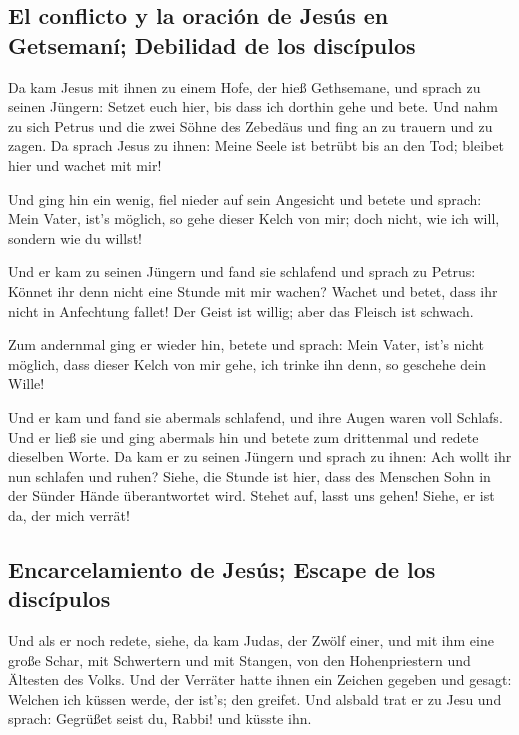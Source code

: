 \hypertarget{el-conflicto-y-la-oraciuxf3n-de-jesuxfas-en-getsemanuxed-debilidad-de-los-discuxedpulos}{%
\subsection{El conflicto y la oración de Jesús en Getsemaní; Debilidad
de los
discípulos}\label{el-conflicto-y-la-oraciuxf3n-de-jesuxfas-en-getsemanuxed-debilidad-de-los-discuxedpulos}}

 Da kam Jesus mit ihnen zu einem Hofe, der hieß
Gethsemane, und sprach zu seinen Jüngern: Setzet euch hier, bis dass ich
dorthin gehe und bete.  Und nahm zu sich Petrus und die
zwei Söhne des Zebedäus und fing an zu trauern und zu zagen.
 Da sprach Jesus zu ihnen: Meine Seele ist betrübt bis an
den Tod; bleibet hier und wachet mit mir!

 Und ging hin ein wenig, fiel nieder auf sein Angesicht
und betete und sprach: Mein Vater, ist's möglich, so gehe dieser Kelch
von mir; doch nicht, wie ich will, sondern wie du willst!

 Und er kam zu seinen Jüngern und fand sie schlafend und
sprach zu Petrus: Könnet ihr denn nicht eine Stunde mit mir wachen?
 Wachet und betet, dass ihr nicht in Anfechtung fallet!
Der Geist ist willig; aber das Fleisch ist schwach.

 Zum andernmal ging er wieder hin, betete und sprach:
Mein Vater, ist's nicht möglich, dass dieser Kelch von mir gehe, ich
trinke ihn denn, so geschehe dein Wille!

 Und er kam und fand sie abermals schlafend, und ihre
Augen waren voll Schlafs.  Und er ließ sie und ging
abermals hin und betete zum drittenmal und redete dieselben Worte.
 Da kam er zu seinen Jüngern und sprach zu ihnen: Ach
wollt ihr nun schlafen und ruhen? Siehe, die Stunde ist hier, dass des
Menschen Sohn in der Sünder Hände überantwortet wird. 
Stehet auf, lasst uns gehen! Siehe, er ist da, der mich verrät!

\hypertarget{encarcelamiento-de-jesuxfas-escape-de-los-discuxedpulos}{%
\subsection{Encarcelamiento de Jesús; Escape de los
discípulos}\label{encarcelamiento-de-jesuxfas-escape-de-los-discuxedpulos}}

 Und als er noch redete, siehe, da kam Judas, der Zwölf
einer, und mit ihm eine große Schar, mit Schwertern und mit Stangen, von
den Hohenpriestern und Ältesten des Volks.  Und der
Verräter hatte ihnen ein Zeichen gegeben und gesagt: Welchen ich küssen
werde, der ist's; den greifet.  Und alsbald trat er zu
Jesu und sprach: Gegrüßet seist du, Rabbi! und küsste ihn.

